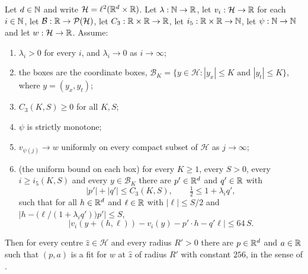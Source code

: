 \begin{lemma}
Let $d\in\mathbb{N}$ and write $\mathcal H=\ell^2(\mathbb{R}^d\times\mathbb{R})$. Let
$\lambda:\mathbb{N}\to\mathbb{R}$, let $v_i:\mathcal H\to\mathbb{R}$ for each $i\in\mathbb{N}$, let
$\mathcal B:\mathbb{R}\to\mathcal P(\mathcal H)$, let $C_3:\mathbb{R}\times\mathbb{R}\to\mathbb{R}$, let
$i_5:\mathbb{R}\times\mathbb{R}\to\mathbb{N}$, let $\psi:\mathbb{N}\to\mathbb{N}$ and let $w:\mathcal H\to\mathbb{R}$. Assume:
\begin{enumerate}
\item\label{it:lifes-lam} $\lambda_i>0$ for every $i$, and $\lambda_i\to0$ as
$i\to\infty$;
\item\label{it:lifes-box} the boxes are the coordinate boxes,
$\mathcal B_K=\{y\in\mathcal H:|y_x|\le K\text{ and }|y_t|\le K\}$, where
$y=(y_x,y_t)$;
\item\label{it:lifes-C3} $C_3(K,S)\ge0$ for all $K,S$;
\item\label{it:lifes-psi} $\psi$ is strictly monotone;
\item\label{it:lifes-conv} $v_{\psi(j)}\to w$ uniformly on every compact subset
of $\mathcal H$ as $j\to\infty$;
\item\label{it:lifes-fit} (the uniform bound on each box) for every $K\ge1$,
every $S>0$, every $i\ge i_5(K,S)$ and every $y\in\mathcal B_K$ there are
$p'\in\mathbb{R}^d$ and $q'\in\mathbb{R}$ with
\[
  |p'|+|q'|\le C_3(K,S),\qquad \tfrac12\le1+\lambda_iq' ,
\]
such that for all $h\in\mathbb{R}^d$ and $\ell\in\mathbb{R}$ with $|\ell|\le S/2$ and
$\bigl|h-\bigl(\ell/(1+\lambda_iq')\bigr)p'\bigr|\le S$,
\[
  \bigl|v_i(y+(h,\ell))-v_i(y)-p'\cdot h-q'\ell\bigr|\le 64\,S .
\]
\end{enumerate}
Then for every centre $\hat z\in\mathcal H$ and every radius $R'>0$ there are
$p\in\mathbb{R}^d$ and $a\in\mathbb{R}$ such that $(p,a)$ is a fit for $w$ at $\hat z$ of
radius $R'$ with constant $256$, in the sense of .
\end{lemma}
